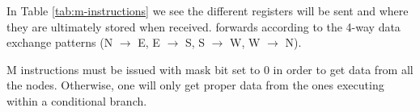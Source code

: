 

In Table \ref{tab:m-instructions} we see the different registers will be sent and
where they are ultimately stored when received.  
forwards according to the 4-way data exchange patterns (N $\rightarrow$ E, E 
$\rightarrow$ S, S $\rightarrow$ W, W $\rightarrow$ N).

M instructions must be issued with mask bit set to 0 in order to get data from
all the nodes. Otherwise, one will only get proper data from the ones executing
within a conditional branch.
